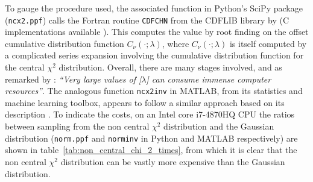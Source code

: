 \documentclass[manuscript,review]{acmart}
\begin{document}
To gauge the procedure used, the associated function in Python's SciPy package (\texttt{ncx2.ppf}) calls the Fortran routine \texttt{CDFCHN} from the CDFLIB library by \citet{brown1994dcdflib} (C implementations available \citep{burkardt2020cdflib}). This computes the value by root finding  \citep[algorithm~R]{bus1975two} on the offset cumulative distribution function $ C_\nu(\cdot;\lambda) $, where $ C_\nu(\cdot;\lambda) $ is itself computed by a complicated series expansion \citep[(26.4.25)]{abramowitz1948handbook} involving the cumulative distribution function for the central $ \chi^2 $ distribution. Overall, there are many stages involved, and as remarked by \citet[\texttt{cdflib.c}]{burkardt2020cdflib}: \textit{``Very large values of
[$ \lambda $] can consume immense computer resources''}. The analogous function \texttt{ncx2inv} in MATLAB, from its statistics and machine learning toolbox, appears to follow a similar approach based on its description \citep[page~4301]{matlab2018statistics}. To indicate the costs, on an Intel core i7-4870HQ CPU the ratios between sampling from the non central $ \chi^2 $ distribution and the Gaussian distribution (\texttt{norm.ppf} and \texttt{norminv} in Python and MATLAB respectively) are shown in table~\ref{tab:non_central_chi_2_times}, from which it is clear that the non central $ \chi^2 $ distribution can be vastly more expensive than the Gaussian distribution. 
\end{document}
